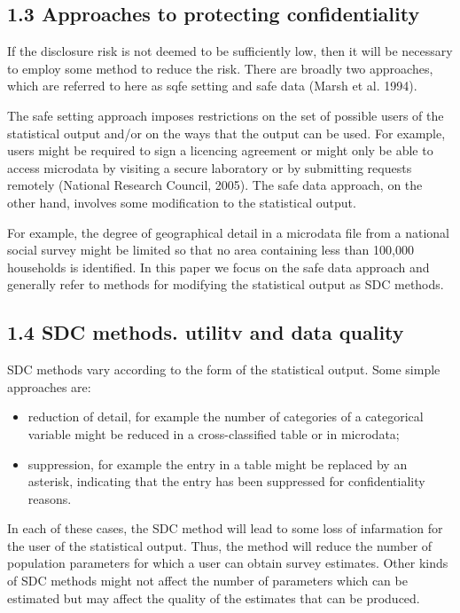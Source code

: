 \subsection*{1.3 Approaches to protecting confidentiality}
If the disclosure risk is not deemed to be sufficiently low, then it will be necessary to
employ some method to reduce the risk. There are broadly two approaches, which are
referred to here as sqfe setting and safe data (Marsh et al. 1994). 

The safe setting
approach imposes restrictions on the set of possible users of the statistical output and/or
on the ways that the output can be used. For example, users might be required to sign a
licencing agreement or might only be able to access microdata by visiting a secure
laboratory or by submitting requests remotely (National Research Council, 2005). The
safe data approach, on the other hand, involves some modification to the statistical
output. 

For example, the degree of geographical detail in a microdata file from a national
social survey might be limited so that no area containing less than 100,000 households is
identified. In this paper we focus on the safe data approach and generally refer to
methods for modifying the statistical output as SDC methods.
\subsection*{1.4 SDC methods. utilitv and data quality}
SDC methods vary according to the form of the statistical output. Some simple
approaches are:
\begin{itemize}
\item reduction of detail, for example the number of categories of a categorical
variable might be reduced in a cross-classified table or in microdata;
\item suppression, for example the entry in a table might be replaced by an asterisk,
indicating that the entry has been suppressed for confidentiality reasons.
\end{itemize}

In each of these cases, the SDC method will lead to some loss of infarmation for the
user of the statistical output. Thus, the method will reduce the number of population
parameters for which a user can obtain survey estimates. Other kinds of SDC methods
might not affect the number of parameters which can be estimated but may affect the
quality of the estimates that can be produced. 

